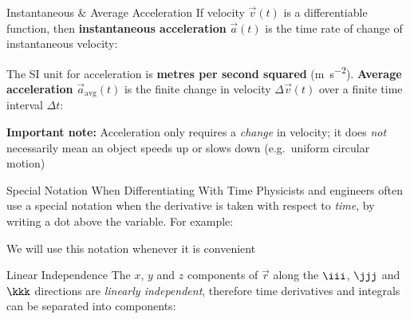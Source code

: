 \documentclass[12pt,compress,aspectratio=169,dvipsnames]{beamer}
\begin{document}
\begin{frame}{Instantaneous \& Average Acceleration}
  If velocity $\vec v(t)$ is a differentiable function, then
  \textbf{instantaneous acceleration} $\vec a(t)$ is the time rate of change of
  instantaneous velocity:


  The SI unit for acceleration is \textbf{metres per second squared}
  (\si{\metre\per\second\squared}). \textbf{Average acceleration}
  $\vec a_\text{avg}(t)$ is the finite change in velocity $\Delta\vec v(t)$ over
  a finite time interval $\Delta t$:


  \textbf{Important note:} Acceleration only requires a \emph{change} in
  velocity; it does \emph{not} necessarily mean an object speeds up or slows
  down (e.g.\ uniform circular motion)
\end{frame}



\begin{frame}{Special Notation When Differentiating With Time}
  Physicists and engineers often use a special notation when the derivative is
  taken with respect to \emph{time}, by writing a dot above the variable. For
  example:

  \vspace{-.3in}{\large
    \begin{align*}
      v &= \dot r \\
      a &= \dot v =\ddot r
    \end{align*}
  }

  We will use this notation whenever it is convenient
\end{frame}



\begin{frame}{Linear Independence}
  The $x$, $y$ and $z$ components of $\vec r$ along the $\iii$, $\jjj$ and
  $\kkk$ directions are \emph{linearly independent}, therefore time
  derivatives and integrals can be separated into components:

\end{frame}
\end{document}
